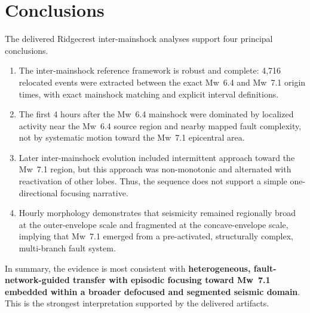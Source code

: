 \documentclass[11pt]{article}
\begin{document}
\section{Conclusions}
The delivered Ridgecrest inter-mainshock analyses support four principal conclusions.

\begin{enumerate}[leftmargin=*]
    \item The inter-mainshock reference framework is robust and complete: 4,716 relocated events were extracted between the exact Mw~6.4 and Mw~7.1 origin times, with exact mainshock matching and explicit interval definitions.
    \item The first 4 hours after the Mw~6.4 mainshock were dominated by localized activity near the Mw~6.4 source region and nearby mapped fault complexity, not by systematic motion toward the Mw~7.1 epicentral area.
    \item Later inter-mainshock evolution included intermittent approach toward the Mw~7.1 region, but this approach was non-monotonic and alternated with reactivation of other lobes. Thus, the sequence does not support a simple one-directional focusing narrative.
    \item Hourly morphology demonstrates that seismicity remained regionally broad at the outer-envelope scale and fragmented at the concave-envelope scale, implying that Mw~7.1 emerged from a pre-activated, structurally complex, multi-branch fault system.
\end{enumerate}

In summary, the evidence is most consistent with \textbf{heterogeneous, fault-network-guided transfer with episodic focusing toward Mw~7.1 embedded within a broader defocused and segmented seismic domain}. This is the strongest interpretation supported by the delivered artifacts.
\end{document}

